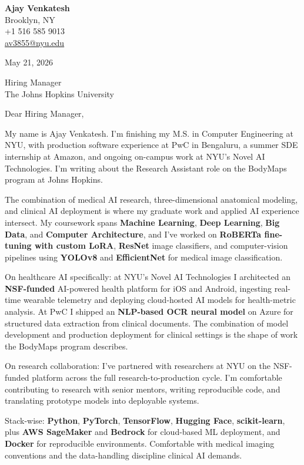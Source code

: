 \documentclass[letterpaper,11pt]{article}
\begin{document}
\begin{flushleft}
\textbf{\large Ajay Venkatesh} \\
Brooklyn, NY \\
+1 516 585 9013 \\
\href{mailto:av3855@nyu.edu}{av3855@nyu.edu}
\end{flushleft}
\vspace{10pt}
May 21, 2026
\vspace{6pt}

Hiring Manager \\
The Johns Hopkins University

\vspace{10pt}

Dear Hiring Manager,

My name is Ajay Venkatesh. I'm finishing my M.S. in Computer Engineering at NYU, with production software experience at PwC in Bengaluru, a summer SDE internship at Amazon, and ongoing on-campus work at NYU's Novel AI Technologies. I'm writing about the Research Assistant role on the BodyMaps program at Johns Hopkins.

The combination of medical AI research, three-dimensional anatomical modeling, and clinical AI deployment is where my graduate work and applied AI experience intersect. My coursework spans \textbf{Machine Learning}, \textbf{Deep Learning}, \textbf{Big Data}, and \textbf{Computer Architecture}, and I've worked on \textbf{RoBERTa fine-tuning with custom LoRA}, \textbf{ResNet} image classifiers, and computer-vision pipelines using \textbf{YOLOv8} and \textbf{EfficientNet} for medical image classification.

On healthcare AI specifically: at NYU's Novel AI Technologies I architected an \textbf{NSF-funded} AI-powered health platform for iOS and Android, ingesting real-time wearable telemetry and deploying cloud-hosted AI models for health-metric analysis. At PwC I shipped an \textbf{NLP-based OCR neural model} on Azure for structured data extraction from clinical documents. The combination of model development and production deployment for clinical settings is the shape of work the BodyMaps program describes.

On research collaboration: I've partnered with researchers at NYU on the NSF-funded platform across the full research-to-production cycle. I'm comfortable contributing to research with senior mentors, writing reproducible code, and translating prototype models into deployable systems.

Stack-wise: \textbf{Python}, \textbf{PyTorch}, \textbf{TensorFlow}, \textbf{Hugging Face}, \textbf{scikit-learn}, plus \textbf{AWS SageMaker} and \textbf{Bedrock} for cloud-based ML deployment, and \textbf{Docker} for reproducible environments. Comfortable with medical imaging conventions and the data-handling discipline clinical AI demands.
\end{document}
